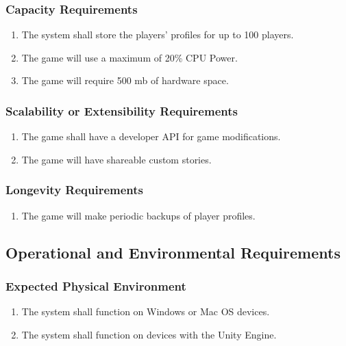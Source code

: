 \documentclass[]{article}
\begin{document}
\subsubsection{Capacity Requirements}
\label{ssub:capacity_requirements}
\begin{enumerate}[{PR}1. ]
	\item The system shall store the players' profiles for up to 100 players.
	\item The game will use a maximum of 20\% CPU Power.
	\item The game will require 500 mb of hardware space.
\end{enumerate}

\subsubsection{Scalability or Extensibility Requirements}
\label{ssub:scalability_or_extensibility_requirements}
\begin{enumerate}[{PR}1. ]
	\item The game shall have a developer API for game modifications.
	\item The game will have shareable custom stories.
\end{enumerate}

\subsubsection{Longevity Requirements}
\label{ssub:longevity_requirements}
\begin{enumerate}[{PR}1. ]
	\item The game will make periodic backups of player profiles.
\end{enumerate}


\subsection{Operational and Environmental Requirements}
\label{sub:operational_and_environmental_requirements}

\subsubsection{Expected Physical Environment}
\label{ssub:expected_physical_environment}
\begin{enumerate}[{OE}1. ]
	\item  The system shall function on Windows or Mac OS devices.
	\item The system shall function on devices with the Unity Engine.
\end{enumerate}
\end{document}
